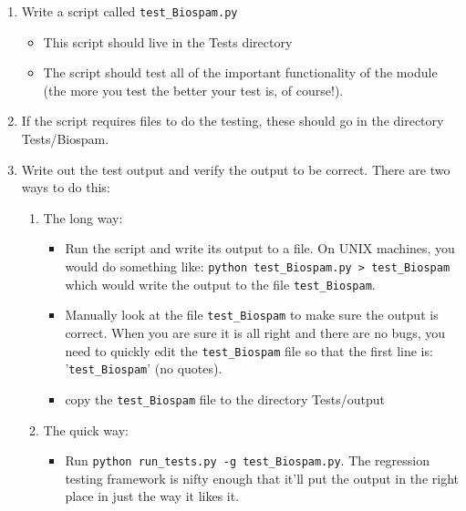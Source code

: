 \documentclass{report}
\begin{document}
\begin{enumerate}
  \item Write a script called \verb|test_Biospam.py|

  \begin{itemize}

    \item This script should live in the Tests directory
       
     \item The script should test all of the important functionality of the module (the more you test the better your test is, of course!).
  \end{itemize}
       
  \item If the script requires files to do the testing, these should go in
       the directory Tests/Biospam.
       
  \item Write out the test output and verify the output to be correct. 
       There are two ways to do this:

  \begin{enumerate}
    \item The long way:

    \begin{itemize}
       
     \item Run the script and write its output to a file. On UNIX machines,
       you would do something like: \verb|python test_Biospam.py > test_Biospam| which would write the output to the file \verb|test_Biospam|.
       
     \item Manually look at the file \verb|test_Biospam| to make sure the output is correct. When you are sure it is all right and there are no bugs, you need to quickly edit the \verb|test_Biospam| file so that the first line is: '\verb|test_Biospam|' (no quotes).

     \item copy the \verb|test_Biospam| file to the directory Tests/output
     
   \end{itemize}

   \item The quick way:

   \begin{itemize}
      \item Run \verb|python run_tests.py -g test_Biospam.py|. The
            regression testing framework is nifty enough that it'll put
            the output in the right place in just the way it likes it.   
       

\end{itemize}
\end{enumerate}
\end{enumerate}
\end{document}

